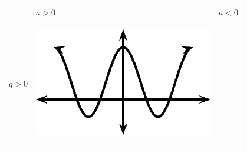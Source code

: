 \setlength\mytablespace{6\tabcolsep}
\addtolength\mytablespace{4\arrayrulewidth}
\setlength\mytablewidth{\linewidth}
\setlength\mytableroom{\mytablewidth}
\addtolength\mytableroom{-\mytablespace}
\setlength\myfixedwidth{0pt}
\setlength\mystarwidth{\mytableroom}
\addtolength\mystarwidth{-\myfixedwidth}
\divide{}
\begin{center}
\label{m39414*uid65}
\noindent
{}
\tablelasttail{}
\begin{xtabular*}{\mytablewidth}[t]{|p{10\mystarwidth}|p{10\mystarwidth}|p{10\mystarwidth}|}\hline
&
    $a>0$
    &
    $a<0$
\tabularnewline{}
    $q>0$
    &
\setcounter{subfigure}{0}
\label{m39414*id88184}
\begin{center}
\label{m39414*id88184!!!underscore!!!media}\label{m39414*id88184!!!underscore!!!printimage}\includegraphics{col11306.imgs/m39414_MG10C15_026.png} %

\end{center}
\end{xtabular*}
\end{center}
